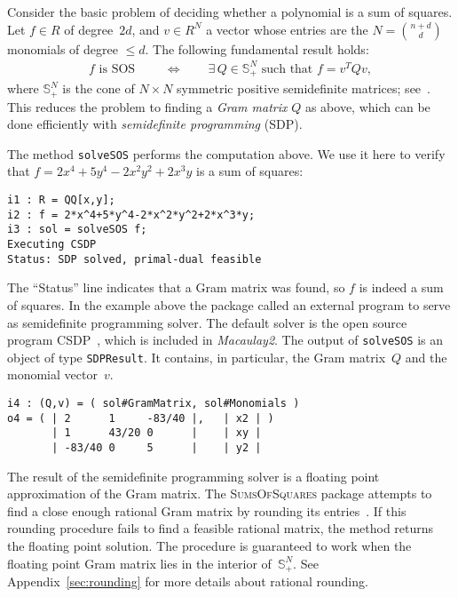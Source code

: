 \documentclass[11pt]{amsart}
\theoremstyle{plain}%
\theoremstyle{definition}
\theoremstyle{remark}
\newcommand{\Mac}{\emph{Macaulay2}\xspace}
\newcommand{\SOS}{\textsc{SumsOfSquares}\xspace}
\begin{document}
Consider the basic problem of deciding whether a polynomial is a sum of squares.
Let $f \!\in\! R$ of degree~$2d$,
and $v \!\in\! R^N$ a vector whose entries are the $N \!=\! \binom{n+d}{d}$ monomials of degree $\leq\!d$.
The following fundamental result holds:
\begin{align*}
  f \text{ is SOS } 
  \qquad\iff\qquad
  \exists\, Q\in \mathbb{S}_+^N \text{ such that } f = v^T Q v,
\end{align*}
where $\mathbb{S}_+^N$ is the cone of $N{\times} N$ symmetric positive semidefinite matrices; see~\cite[\S3.1]{blekherman2012semidefinite}.
This reduces the problem to finding a \emph{Gram matrix} $Q$ as above, which can be done efficiently with \emph{semidefinite programming} (SDP).

The method \verb|solveSOS| performs the computation above.
We use it here to verify that $f = 2 x^4 {+} 5 y^4 {-} 2 x^2 y^2 {+} 2 x^3 y$ is a sum of squares:
{\small
\begin{verbatim}
i1 : R = QQ[x,y];
i2 : f = 2*x^4+5*y^4-2*x^2*y^2+2*x^3*y;
i3 : sol = solveSOS f;
Executing CSDP
Status: SDP solved, primal-dual feasible
\end{verbatim}
}
\noindent
The ``Status'' line indicates that a Gram matrix was found, so $f$ is indeed a sum of squares.
In the example above the package called an external program to serve as semidefinite programming solver.
The default solver is the open source program CSDP~\cite{borchers1999csdp}, which is included in \Mac.
The output of \verb|solveSOS| is an object of type \verb|SDPResult|.
It contains, in particular, the Gram matrix~$Q$ and the monomial vector~$v$.
{\small
\begin{verbatim}
i4 : (Q,v) = ( sol#GramMatrix, sol#Monomials )
o4 = ( | 2      1     -83/40 |,   | x2 | )
       | 1      43/20 0      |    | xy | 
       | -83/40 0     5      |    | y2 | 
\end{verbatim}
}
\noindent
The result of the semidefinite programming solver is a floating point approximation of the Gram matrix.
The \SOS package attempts to find a close enough rational Gram matrix by rounding its entries~\cite{peyrl2008computing}.
If this rounding procedure fails to find a feasible rational matrix, the method returns the floating point solution.
The procedure is guaranteed to work when the floating point Gram matrix lies in the interior of~$\mathbb{S}_+^N$.
See Appendix~\ref{sec:rounding} for more details about rational rounding.
\end{document}

